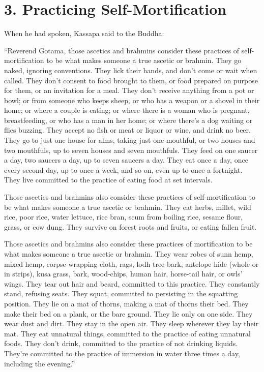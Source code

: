 \documentclass[12pt,openany]{book}%
\begin{document}
\section*{3. Practicing Self-Mortification }

When he had spoken, Kassapa said to the Buddha: 

“Reverend Gotama, those ascetics and brahmins consider these practices of self-mortification to be what makes someone a true ascetic or brahmin. They go naked, ignoring conventions. They lick their hands, and don’t come or wait when called. They don’t consent to food brought to them, or food prepared on purpose for them, or an invitation for a meal. They don’t receive anything from a pot or bowl; or from someone who keeps sheep, or who has a weapon or a shovel in their home; or where a couple is eating; or where there is a woman who is pregnant, breastfeeding, or who has a man in her home; or where there’s a dog waiting or flies buzzing. They accept no fish or meat or liquor or wine, and drink no beer. They go to just one house for alms, taking just one mouthful, or two houses and two mouthfuls, up to seven houses and seven mouthfuls. They feed on one saucer a day, two saucers a day, up to seven saucers a day. They eat once a day, once every second day, up to once a week, and so on, even up to once a fortnight. They live committed to the practice of eating food at set intervals. 

Those ascetics and brahmins also consider these practices of self-mortification to be what makes someone a true ascetic or brahmin. They eat herbs, millet, wild rice, poor rice, water lettuce, rice bran, scum from boiling rice, sesame flour, grass, or cow dung. They survive on forest roots and fruits, or eating fallen fruit. 

Those ascetics and brahmins also consider these practices of mortification to be what makes someone a true ascetic or brahmin. They wear robes of sunn hemp, mixed hemp, corpse-wrapping cloth, rags, lodh tree bark, antelope hide (whole or in strips), kusa grass, bark, wood-chips, human hair, horse-tail hair, or owls’ wings. They tear out hair and beard, committed to this practice. They constantly stand, refusing seats. They squat, committed to persisting in the squatting position. They lie on a mat of thorns, making a mat of thorns their bed. They make their bed on a plank, or the bare ground. They lie only on one side. They wear dust and dirt. They stay in the open air. They sleep wherever they lay their mat. They eat unnatural things, committed to the practice of eating unnatural foods. They don’t drink, committed to the practice of not drinking liquids. They’re committed to the practice of immersion in water three times a day, including the evening.” 
\end{document}
